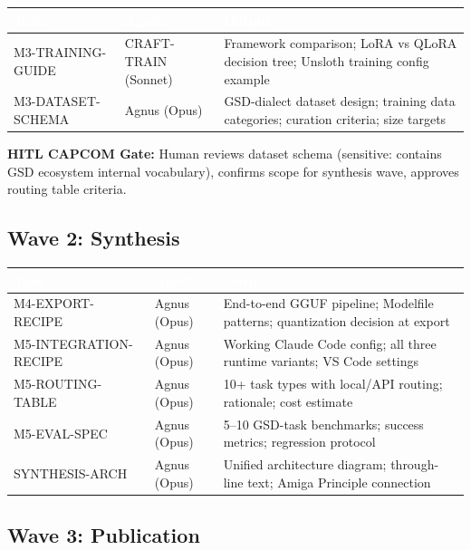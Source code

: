 \documentclass[11pt,letterpaper]{article}
\newcommand{\tableheader}[1]{\textbf{\sffamily\textcolor{white}{#1}}}
\begin{document}
\begin{center}
\begin{tabularx}{\textwidth}{L{3cm}L{2cm}X}
\toprule
{}
\tableheader{Task} & \tableheader{Agent} & \tableheader{Output} \\
\midrule
M3-TRAINING-GUIDE & CRAFT-TRAIN (Sonnet) & Framework comparison; LoRA vs QLoRA decision tree; Unsloth training config example \\
M3-DATASET-SCHEMA & Agnus (Opus) & GSD-dialect dataset design; training data categories; curation criteria; size targets \\
\bottomrule
\end{tabularx}
\end{center}

\textbf{HITL CAPCOM Gate:} Human reviews dataset schema (sensitive: contains GSD ecosystem internal vocabulary), confirms scope for synthesis wave, approves routing table criteria.

\subsection{Wave 2: Synthesis}

\begin{center}
\begin{tabularx}{\textwidth}{L{3.5cm}L{2cm}X}
\toprule
{}
\tableheader{Task} & \tableheader{Agent} & \tableheader{Output} \\
\midrule
M4-EXPORT-RECIPE & Agnus (Opus) & End-to-end GGUF pipeline; Modelfile patterns; quantization decision at export \\
M5-INTEGRATION-RECIPE & Agnus (Opus) & Working Claude Code config; all three runtime variants; VS Code settings \\
M5-ROUTING-TABLE & Agnus (Opus) & 10+ task types with local/API routing; rationale; cost estimate \\
M5-EVAL-SPEC & Agnus (Opus) & 5--10 GSD-task benchmarks; success metrics; regression protocol \\
SYNTHESIS-ARCH & Agnus (Opus) & Unified architecture diagram; through-line text; Amiga Principle connection \\
\bottomrule
\end{tabularx}
\end{center}

\subsection{Wave 3: Publication}
\end{document}
